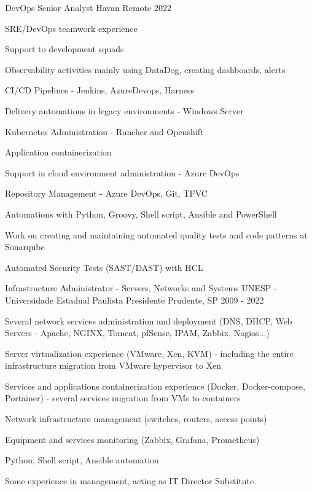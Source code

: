 \begin{cventries}
  \cventry
    {DevOps Senior Analyst} %
    {Havan} %
    {Remote} %
    {2022} %
    {
      \begin{cvitems} %
        \item {SRE/DevOps teamwork experience}
        \item {Support to development squads}
        \item {Observability activities mainly using DataDog, creating dashboards, alerts}
        \item {CI/CD Pipelines - Jenkins, AzureDevops, Harness}
        \item {Delivery automations in legacy environments - Windows Server}
        \item {Kubernetes Administration - Rancher and Openshift}
        \item {Application containerization}
        \item {Support in cloud environment administration - Azure DevOps}
        \item {Repository Management - Azure DevOps, Git, TFVC}
        \item {Automations with Python, Groovy, Shell script, Ansible and PowerShell}
        \item {Work on creating and maintaining automated quality tests and code patterns at Sonarqube}
        \item {Automated Security Tests (SAST/DAST) with HCL}
      \end{cvitems}
    }

  \cventry
    {Infrastructure Administrator - Servers, Networks and Systems} %
    {UNESP - Universidade Estadual Paulista} %
    {Presidente Prudente, SP} %
    {2009 - 2022} %
    {
      \begin{cvitems} %
        \item {Several network services administration and deployment (DNS, DHCP, Web Servers - Apache, NGINX, Tomcat, pfSense, IPAM, Zabbix, Nagios...)}
        \item {Server virtualization experience (VMware, Xen, KVM) - including the entire infrastructure migration from VMware hypervisor to Xen}
        \item {Services and applications containerization experience (Docker, Docker-compose, Portainer) - several services migration from VMs to containers}
        \item {Network infrastructure management (switches, routers, access points)}
        \item {Equipment and services monitoring (Zabbix, Grafana, Prometheus)}
        \item {Python, Shell script, Ansible automation}
        \item {Some experience in management, acting as IT Director Substitute.}
      \end{cvitems}
    }


\end{cventries}
